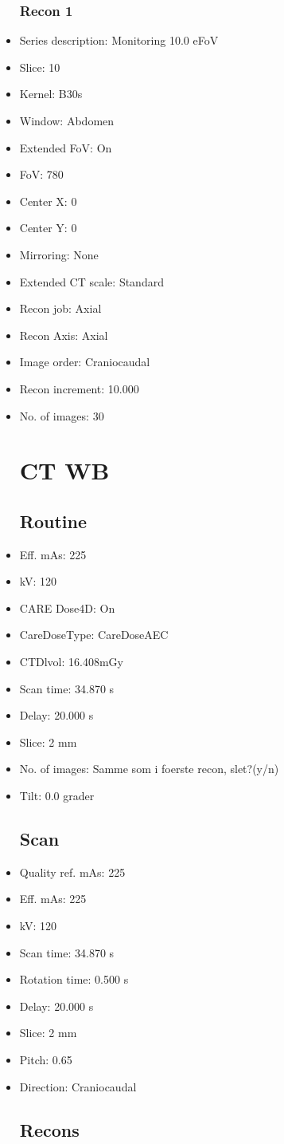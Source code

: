 \documentclass[12pt]{article}
\begin{document}
\begin{itemize}
\subsubsection{Recon 1}
\item Series description: Monitoring 10.0 eFoV
\item Slice: 10
\item Kernel: B30s
\item Window: Abdomen
\item Extended FoV: On
\item FoV: 780
\item Center X: 0
\item Center Y: 0
\item Mirroring: None
\item Extended CT scale: Standard
\item Recon job: Axial
\item Recon Axis: Axial
\item Image order: Craniocaudal
\item Recon increment: 10.000
\item No. of images: 30
\section{CT WB}
\subsection{Routine}
\item Eff. mAs: 225\item kV: 120\item CARE Dose4D: On\item CareDoseType: CareDoseAEC\item CTDlvol: 16.408mGy\item Scan time: 34.870 s\item Delay: 20.000 s\item Slice: 2 mm\item No. of images: Samme som i foerste recon, slet?(y/n)\item Tilt: 0.0 grader
\subsection{Scan}
\item Quality ref. mAs: 225\item Eff. mAs: 225\item kV: 120\item Scan time: 34.870 s\item Rotation time: 0.500 s\item Delay: 20.000 s\item Slice: 2 mm\item Pitch: 0.65\item Direction: Craniocaudal\subsection{Recons}


\end{itemize}
\end{document}
